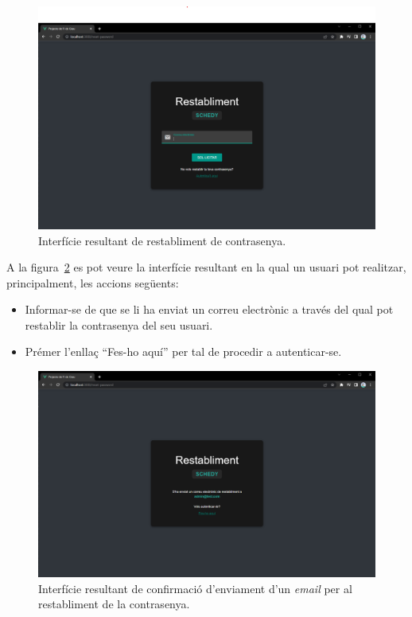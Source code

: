 \documentclass[a4paper,12pt]{ThesisStyle}
\begin{document}
\begin{figure}[H]
  \centering
  \includegraphics[width=\textwidth]{assets/results/auth/restabliment.png}
  \caption{\label{img:resultats_auth_restabliment}Interfície resultant de restabliment de contrasenya.}
\end{figure}

\newpage

A la figura~\ref{img:resultats_auth_restablerta} es pot veure la interfície resultant en la qual un usuari pot realitzar, principalment, les accions següents:
\begin{itemize}
  \item Informar-se de que se li ha enviat un correu electrònic a través del qual pot restablir la contrasenya del seu usuari.
  \item Prémer l'enllaç ``Fes-ho aquí'' per tal de procedir a autenticar-se.
\end{itemize}

\begin{figure}[H]
  \centering
  \includegraphics[width=\textwidth]{assets/results/auth/restablerta.png}
  \caption{\label{img:resultats_auth_restablerta}Interfície resultant de confirmació d'enviament d'un \textit{email} per al restabliment de la contrasenya.}
\end{figure}
\end{document}
